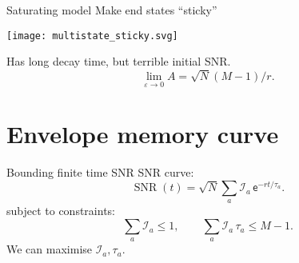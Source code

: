 \documentclass{beamer}%
\DeclareMathOperator{\snr}{SNR}
\newcommand{\initial}{\mathcal{I}}
\renewcommand{\e}{\mathsf{e}}
\begin{document}

\begin{frame}{Saturating model}
%
 Make end states ``sticky''
 \begin{center}
   \texttt{[image: multistate\_sticky.svg]}
 \end{center}
 Has long decay time, but terrible initial SNR.
 \begin{equation*}
   \lim_{\varepsilon\to0}A=\sqrt{N}(M-1)/r.
 \end{equation*}
%
\end{frame}



\section{Envelope memory curve}


\begin{frame}{Bounding finite time SNR}
%
 SNR curve:
 \begin{equation*}
   \snr(t) = \sqrt{N}\sum_a \initial_a \,\e^{-rt/\tau_a}.
 \end{equation*}
 subject to constraints:
 \begin{equation*}
   \sum_a \initial_a \leq 1,
   \qquad
   \sum_a \initial_a\, \tau_a \leq M-1.
 \end{equation*}
 We can maximise \wrt $\initial_a,\tau_a$.
%
\end{frame}


\end{document}
